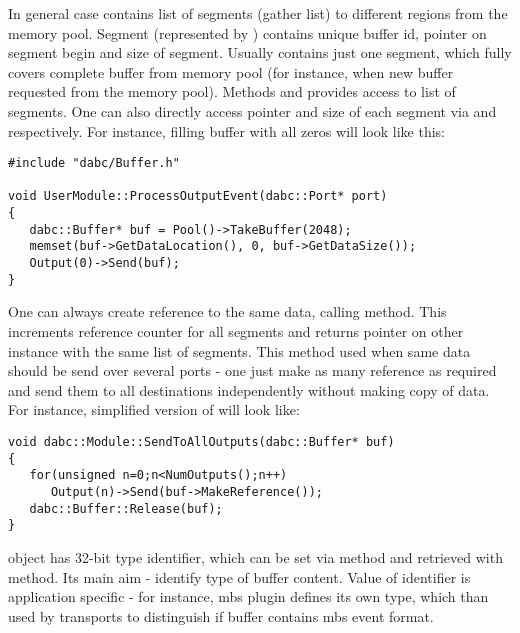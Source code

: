 In general case  contains list of segments (gather list) to different 
regions from the memory pool.
Segment (represented by ) contains unique buffer id, pointer
on segment begin and size of segment. Usually  contains 
just one segment, which fully covers complete buffer from memory pool (for instance, 
when new buffer requested from the memory pool). Methods  and
 provides access to list of segments. One can also directly access
pointer and size of each segment via  and 
respectively. For instance, filling buffer with all zeros will look like this:  
 
\begin{small}
\begin{verbatim}     
#include "dabc/Buffer.h"

void UserModule::ProcessOutputEvent(dabc::Port* port)
{
   dabc::Buffer* buf = Pool()->TakeBuffer(2048);
   memset(buf->GetDataLocation(), 0, buf->GetDataSize());
   Output(0)->Send(buf);
}
\end{verbatim}     
\end{small}

One can always create reference to the same data, calling  method.
This increments reference counter for all segments and returns pointer on
other  instance with the same list of segments. This method used
when same data should be send over several ports - one just make as many reference 
as required and send them to all destinations independently without making copy of data.
For instance, simplified version of  will look like:  

\begin{small}
\begin{verbatim}     
void dabc::Module::SendToAllOutputs(dabc::Buffer* buf)
{
   for(unsigned n=0;n<NumOutputs();n++)
      Output(n)->Send(buf->MakeReference());
   dabc::Buffer::Release(buf);
}
\end{verbatim}     
\end{small}


 object has 32-bit type identifier, which can be set via
 method and retrieved with  method.
Its main aim - identify type of buffer content. Value of   
identifier is application specific - for instance, mbs plugin defines its own type,
which than used by transports to distinguish if buffer contains mbs event format.  

